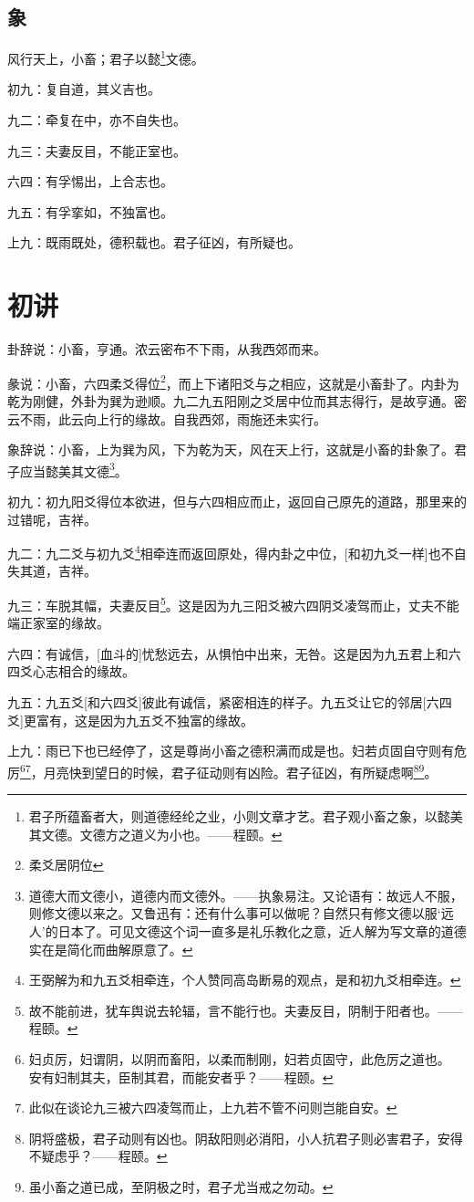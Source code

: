 \documentclass[12pt,oneside]{book}
\begin{document}
\subsection{象}
风行天上，小畜；君子以懿\footnote{君子所蕴畜者大，则道德经纶之业，小则文章才艺。君子观小畜之象，以懿美其文德。文德方之道义为小也。——程颐。}文德。

初九：复自道，其义吉也。

九二：牵复在中，亦不自失也。

九三：夫妻反目，不能正室也。

六四：有孚惕出，上合志也。

九五：有孚挛如，不独富也。

上九：既雨既处，德积载也。君子征凶，有所疑也。


\section{初讲}
卦辞说：小畜，亨通。浓云密布不下雨，从我西郊而来。

彖说：小畜，六四柔爻得位\footnote{柔爻居阴位}，而上下诸阳爻与之相应，这就是小畜卦了。内卦为乾为刚健，外卦为巽为逊顺。九二九五阳刚之爻居中位而其志得行，是故亨通。密云不雨，此云向上行的缘故。自我西郊，雨施还未实行。

象辞说：小畜，上为巽为风，下为乾为天，风在天上行，这就是小畜的卦象了。君子应当懿美其文德\footnote{道德大而文德小，道德内而文德外。——执象易注。又论语有：故远人不服，则修文德以来之。又鲁迅有：还有什么事可以做呢？自然只有修文德以服‘远人’的日本了。可见文德这个词一直多是礼乐教化之意，近人解为写文章的道德实在是简化而曲解原意了。}。

初九：初九阳爻得位本欲进，但与六四相应而止，返回自己原先的道路，那里来的过错呢，吉祥。

九二：九二爻与初九爻\footnote{王弼解为和九五爻相牵连，个人赞同高岛断易的观点，是和初九爻相牵连。}相牵连而返回原处，得内卦之中位，[和初九爻一样]也不自失其道，吉祥。

九三：车脱其幅，夫妻反目\footnote{故不能前进，犹车舆说去轮辐，言不能行也。夫妻反目，阴制于阳者也。——程颐。}。这是因为九三阳爻被六四阴爻凌驾而止，丈夫不能端正家室的缘故。

六四：有诚信，[血斗的]忧愁远去，从惧怕中出来，无咎。这是因为九五君上和六四爻心志相合的缘故。

九五：九五爻[和六四爻]彼此有诚信，紧密相连的样子。九五爻让它的邻居[六四爻]更富有，这是因为九五爻不独富的缘故。

上九：雨已下也已经停了，这是尊尚小畜之德积满而成是也。妇若贞固自守则有危厉\footnote{ 妇贞厉，妇谓阴，以阴而畜阳，以柔而制刚，妇若贞固守，此危厉之道也。 安有妇制其夫，臣制其君，而能安者乎？——程颐。}\footnote{此似在谈论九三被六四凌驾而止，上九若不管不问则岂能自安。}，月亮快到望日的时候，君子征动则有凶险。君子征凶，有所疑虑啊\footnote{阴将盛极，君子动则有凶也。阴敌阳则必消阳，小人抗君子则必害君子，安得不疑虑乎？——程颐。}\footnote{虽小畜之道已成，至阴极之时，君子尤当戒之勿动。}。
\end{document}
